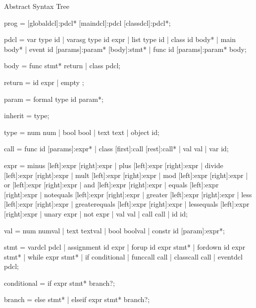Abstract Syntax Tree \label{AST}

    prog        =   [globaldcl]:pdcl* [maindcl]:pdcl [classdcl]:pdcl*;

    pdcl        =   {var} type id
                |   {varasg} type id expr
                |   {list} type id
                |   {class} id body*
                |   {main} body*
                |   {event} id [params]:param* [body]:stmt*
                |   {func} id [params]:param* body;

    body        =   {func} stmt* return
                |   {class} pdcl;

    return      =   {id} expr
                |   {empty} ;

    param       =   {formal} type id param*;

    inherit     =   type;

    type        =   {num} num
                |   {bool} bool
                |   {text} text
                |   {object} id;

    call        =   {func} id [params]:expr*
                |   {class} [first]:call [rest]:call*
                |   {val} val
                |   {var} id;

    expr        =   {minus} [left]:expr [right]:expr
                |   {plus} [left]:expr [right]:expr
                |   {divide} [left]:expr [right]:expr
                |   {mult} [left]:expr [right]:expr
                |   {mod} [left]:expr [right]:expr
                |   {or} [left]:expr [right]:expr
                |   {and} [left]:expr [right]:expr
                |   {equals} [left]:expr [right]:expr
                |   {notequals} [left]:expr [right]:expr
                |   {greater} [left]:expr [right]:expr
                |   {less} [left]:expr [right]:expr
                |   {greaterequals} [left]:expr [right]:expr
                |   {lessequals} [left]:expr [right]:expr
                |   {unary} expr
                |   {not} expr
                |   {val} val
                |   {call} call
                |   {id} id;

    val         =   {num} numval
                |   {text} textval
                |   {bool} boolval
                |   {constr} id [param]:expr*;

    stmt        =   {vardcl} pdcl
                |   {assignment} id expr
                |   {forup} id expr stmt*
                |   {fordown} id expr stmt*
                |   {while} expr stmt*
                |   {if} conditional
                |   {funccall} call
                |   {classcall} call
                |   {eventdcl} pdcl;

    conditional  =   {if} expr stmt* branch?;

    branch      =   {else} stmt*
                |   {elseif} expr stmt* branch?;